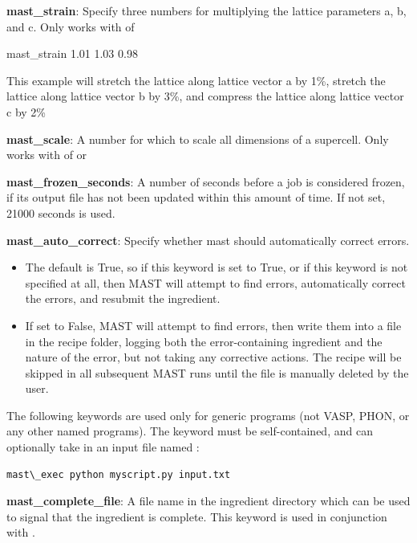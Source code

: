 \documentclass[letterpaper,10pt,english]{sphinxmanual}
\begin{document}
\textbf{mast\_strain}: Specify three numbers for multiplying the lattice parameters a, b, and c. Only works with  of 

mast\_strain 1.01 1.03 0.98

This example will stretch the lattice along lattice vector a by 1\%, stretch the lattice along lattice vector b by 3\%, and compress the lattice along lattice vector c by 2\%

\textbf{mast\_scale}: A number for which to scale all dimensions of a supercell. Only works with  of  or 

\textbf{mast\_frozen\_seconds}: A number of seconds before a job is considered frozen, if its output file has not been updated within this amount of time. If not set, 21000 seconds is used.

\textbf{mast\_auto\_correct}: Specify whether mast should automatically correct errors.
\begin{itemize}
\item {} 
The default is True, so if this keyword is set to True, or if this keyword is not specified at all, then MAST will attempt to find errors, automatically correct the errors, and resubmit the ingredient.

\item {} 
If set to False, MAST will attempt to find errors, then write them into a  file in the recipe folder, logging both the error-containing ingredient and the nature of the error, but not taking any corrective actions. The recipe will be skipped in all subsequent MAST runs until the  file is manually deleted by the user.

\end{itemize}

The following keywords are used only for generic programs (not VASP, PHON, or any other named programs). The  keyword must be self-contained, and can optionally take in an input file named :

\begin{Verbatim}[commandchars=\\\{\}]
mast\_exec python myscript.py input.txt
\end{Verbatim}

\textbf{mast\_complete\_file}: A file name in the ingredient directory which can be used to signal that the ingredient is complete. This keyword is used in conjunction with .
\end{document}
